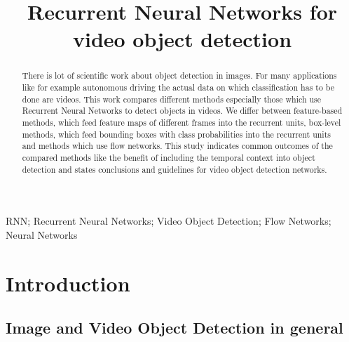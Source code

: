 \documentclass[conference]{IEEEtran}
\begin{document}
\title{Recurrent Neural Networks for video object detection}

\author{
\and
{}
}

\maketitle

\begin{abstract}
There is lot of scientific work about object detection in images. For many applications like for example autonomous driving the actual data on which classification has to be done are videos. This work compares different methods especially those which use Recurrent Neural Networks to detect objects in videos. We differ between feature-based methods, which feed feature maps of different frames into the recurrent units, box-level methods, which feed bounding boxes with class probabilities into the recurrent units and methods which use flow networks. This study indicates common outcomes of the compared methods like the benefit of including the temporal context into object detection and states conclusions and guidelines for video object detection networks. 
\end{abstract}

\begin{IEEEkeywords}
RNN; Recurrent Neural Networks; Video Object Detection; Flow Networks; Neural Networks
\end{IEEEkeywords}

\section{Introduction}

\subsection{Image and Video Object Detection in general}
\end{document}
